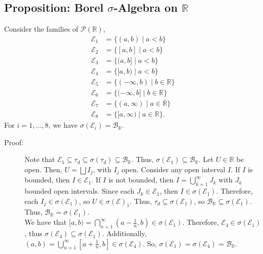 \documentclass[9pt]{extarticle}
\newcommand{\R}{\mathbb{R}}
\begin{document}
  \subsection{Proposition: Borel $\sigma$-Algebra on $\R$}%
  Consider the families of $\mathcal{P}(\R)$,
  \begin{align*}
    \mathcal{E}_1 &= \{(a,b)\mid a < b\}\\
    \mathcal{E}_2 &= \{[a,b]\mid a<b \}\\
    \mathcal{E}_3 &= \{(a,b]\mid a < b\}\\
    \mathcal{E}_4 &= \{[a,b)\mid a < b\}\\
    \mathcal{E}_5 &= \{(-\infty,b)\mid b\in \R\}\\
    \mathcal{E}_6 &= \{(-\infty,b]\mid b\in \R\}\\
    \mathcal{E}_7 &= \{(a,\infty)\mid a\in \R\}\\
    \mathcal{E}_8 &= \{[a,\infty)\mid a\in \R\}.
  \end{align*}
  For $i = 1,\dots,8$, we have $\sigma(\mathcal{E}_i) = \mathcal{B}_{\R}$.
  \begin{description}
    \item[Proof:] Note that $\mathcal{E}_1\subseteq \tau_d\subseteq \sigma(\tau_d)\subseteq \mathcal{B}_{\R}$. Thus, $\sigma(\mathcal{E}_1)\subseteq \mathcal{B}_{\R}$. Let $U\in \R$ be open. Then, $U = \bigsqcup I_j$, with $I_j$ open. Consider any open interval $I$. If $I$ is bounded, then $I\in \mathcal{E}_1$. If $I$ is not bounded, then $I = \bigcup_{k=1}^{\infty} J_{k}$ with $J_k$ bounded open intervals. Since each $J_k\in \mathcal{E}_1$, then $I\in \sigma(\mathcal{E}_1)$. Therefore, each $I_j\in \sigma(\mathcal{E}_1)$, so $U\in \sigma(\mathcal{E})_1$. Thus, $\tau_d \subseteq \sigma(\mathcal{E}_1)$, so $\mathcal{B}_{\R}\subseteq \sigma(\mathcal{E}_1)$.\\

      Thus, $\mathcal{B}_{\R} = \sigma(\mathcal{E}_1)$.\\

      We have that $[a,b) = \bigcap_{n=1}^{\infty} \left(a-\frac{1}{n},b\right) \in \sigma(\mathcal{E}_1)$. Therefore, $\mathcal{E}_4\in \sigma(\mathcal{E}_1)$, thus $\sigma(\mathcal{E}_4)\subseteq \sigma(\mathcal{E}_1)$. Additionally, $(a,b) = \bigcup_{n=1}^{\infty}\left[a+\frac{1}{n},b\right]\in \sigma(\mathcal{E}_4)$. So, $\sigma(\mathcal{E}_1) = \sigma(\mathcal{E}_4) = \mathcal{B}_{\R}$.
  \end{description}
\end{document}
